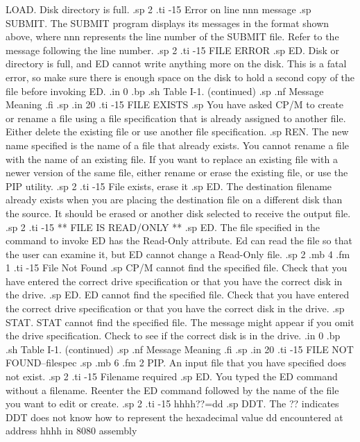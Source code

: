 LOAD.  Disk directory is full.
.sp 2
.ti -15
Error on line nnn message
.sp
SUBMIT.  The SUBMIT program displays its messages in the format 
shown above, where nnn represents the line number of the SUBMIT 
file.  Refer to the message following the line number.
.sp 2
.ti -15
FILE ERROR
.sp
ED.  Disk or directory is full, and ED cannot write anything more 
on the disk.  This is a fatal error, so make sure there is enough 
space on the disk to hold a second copy of the file before 
invoking ED.
.in 0
.bp
.sh
                     Table I-1.  (continued)
.sp
.nf
     Message        Meaning
.fi
.sp
.in 20
.ti -15
FILE EXISTS
.sp
You have asked CP/M to create or rename a file using a file 
specification that is already assigned to another file.  Either 
delete the existing file or use another file specification.
.sp
REN.  The new name specified is the name of a file that already 
exists.  You cannot rename a file with the name of an existing 
file.  If you want to replace an existing file with a newer 
version of the same file, either rename or erase the existing 
file, or use the PIP utility.
.sp 2
.ti -15
File exists, erase it
.sp 
ED.  The destination filename already exists when you are placing 
the destination file on a different disk than the source.  It 
should be erased or another disk selected to receive the output 
file.
.sp 2
.ti -15
** FILE IS READ/ONLY **
.sp 
ED.  The file specified in the command to invoke ED has the 
Read-Only attribute.  Ed can read the file so that the user can 
examine it, but ED cannot change a Read-Only file.
.sp 2
.mb 4
.fm 1
.ti -15
File Not Found
.sp
CP/M cannot find the specified file.  Check that you have entered 
the correct drive specification or that you have the correct disk 
in the drive.
.sp
ED.  ED cannot find the specified file.  Check that you have 
entered the correct drive specification or that you have the 
correct disk in the drive.
.sp
STAT.  STAT cannot find the specified file.  The message might 
appear if you omit the drive specification.  Check to see if the 
correct disk is in the drive.
.in 0
.bp
.sh
                     Table I-1.  (continued)
.sp
.nf
     Message        Meaning
.fi
.sp
.in 20
.ti -15
FILE NOT FOUND--{filespec}
.sp
.mb 6
.fm 2
PIP.  An input file that you have specified does not exist.
.sp 2
.ti -15
Filename required  
.sp
ED.  You typed the ED command without a filename.  Reenter the ED 
command followed by the name of the file you want to edit or 
create.
.sp 2
.ti -15
hhhh??=dd
.sp
DDT.  The ?? indicates DDT does not know how to represent the 
hexadecimal value dd encountered at address hhhh in 8080 assembly 
